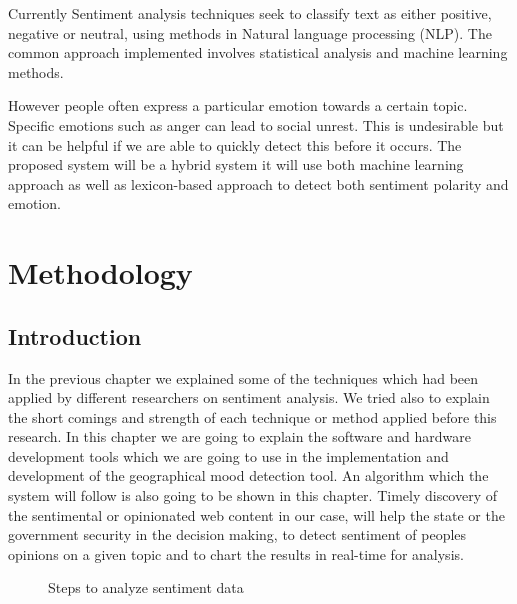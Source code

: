 Currently Sentiment analysis techniques seek to classify text as either positive, negative or neutral, using methods in Natural language processing (NLP). The common approach implemented involves statistical analysis and machine learning methods. \cite{ref2}

%
However people often express a particular emotion towards a certain topic. Specific emotions such as anger can lead to social unrest. This is undesirable but it can be helpful if we are able to quickly detect this before it occurs.
%
The proposed system will be a hybrid system it will use both machine learning approach as well as lexicon-based approach to detect both sentiment polarity and emotion.


\clearpage


\section{Methodology}
\subsection{Introduction}
In the previous chapter we explained some of the techniques which had been applied by different
researchers on sentiment analysis. We tried also to explain the short comings and
strength of each technique or method applied before this research. In this chapter we are going to
explain the software and hardware development tools which we are going to use in the
implementation and development of the geographical mood detection tool. An algorithm which
the system will follow is also going to be shown in this chapter. Timely discovery of the
sentimental or opinionated web content in our case, will help the state or the government security
in the decision making, to detect sentiment of people\textquotesingle s opinions on a given topic and  to chart the results in real-time for analysis.


\begin{figure}[h]
  \centering
  \caption[Steps to analyze sentiment data]%
  {Steps to analyze sentiment data}
  \label{fig:ALAP:sm1}
\end{figure}




